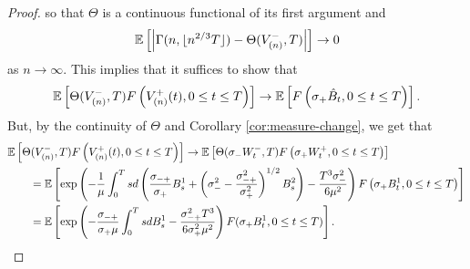 \begin{proof}
so that $\Theta$ is a continuous functional of its first argument and 
$${\mathbb E}\left[\left|\Gamma(n,\lfloor n^{2/3}T\rfloor)-\Theta({V}^-_{(n)} ,T)\right|\right]\to 0$$
as $n\to\infty$. This implies that it suffices to show that 
$${\mathbb E}\left[\Theta({V}^-_{(n)} ,T)F\left(V^+_{(n)}(t), 0\leq t \leq T \right)\right] \to {\mathbb E}\left[F\left(\sigma_+\hat{B}_t,0\leq t\leq T\right)\right].$$
But, by the continuity of $\Theta$ and Corollary \ref{cor:measure-change}, we get that 
\begin{align*}&\E\left[\Theta({V}^-_{(n)} ,T)F\left(V^+_{(n)}(t), 0\leq t \leq T \right)\right]\to \E\left[\Theta(\sigma_- W_t^- ,T)F\left(\sigma_+W_t^+, 0\leq t \leq T \right)\right]\\
&\qquad=\E\left[\exp\left(-\frac{1}{\mu}\int_0^Tsd\left(\frac{\sigma_{-+}}{\sigma_+}B_s^1+\left(\sigma_-^2-\frac{\sigma_{-+}^2}{\sigma_+^2}\right)^{1/2}B_s^2\right) - \frac{T^3 \sigma_-^2}{6\mu^2}\right) F\left(\sigma_+ B_t^1, 0\leq t \leq T\right)\right]\\
 &\qquad=\E\left[\exp\left(-\frac{\sigma_{-+}}{\sigma_+ \mu} \int_0^T s dB^1_s -\frac{\sigma_{-+}^2 T^3}{6\sigma_+^2 \mu^2}\right)F(\sigma_+ B^1_t,   0\leq t \leq T)\right].\end{align*}




 

\end{proof}
